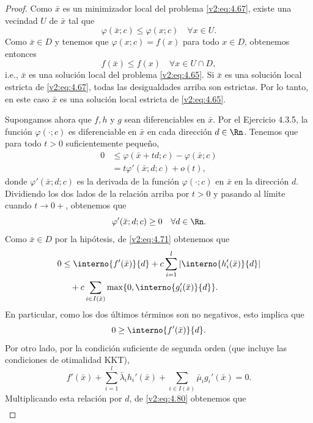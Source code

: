 \begin{proof}
    Como $\bar{x}$ es un minimizador local del problema \eqref{v2:eq:4.67}, existe una vecindad $U$ de $\bar{x}$ tal que
    \[
        \varphi(\bar{x}; c) \le \varphi(x; c) \quad \forall x \in U.
    \]
    Como $\bar{x} \in D$ y tenemos que $\varphi(x; c) = f(x)$ para todo $x \in D$, obtenemos entonces
    \[
        f(\bar{x}) \le f(x) \quad \forall x \in U \cap D,
    \]
    i.e., $\bar{x}$ es una solución local del problema \eqref{v2:eq:4.65}. Si $\bar{x}$ es una solución local estricta de \eqref{v2:eq:4.67}, todas las desigualdades arriba son estrictas. Por lo tanto, en este caso $\bar{x}$ es una solución local estricta de \eqref{v2:eq:4.65}.
    
    Supongamos ahora que $f, h$ y $g$ sean diferenciables en $\bar{x}$. Por el Ejercicio 4.3.5, la función $\varphi(\cdot; c)$ es diferenciable en $\bar{x}$ en cada dirección $d \in \Rn$. Tenemos que para todo $t > 0$ suficientemente pequeño,
    \begin{align*}
        0 &\le \varphi(\bar{x} + td; c) - \varphi(\bar{x}; c) \\
        &= t\varphi'(\bar{x}; d; c) + o(t),
    \end{align*}
    donde $\varphi'(\bar{x}; d; c)$ es la derivada de la función $\varphi(\cdot; c)$ en $\bar{x}$ en la dirección $d$. Dividiendo los dos lados de la relación arriba por $t > 0$ y pasando al límite cuando $t \to 0+$, obtenemos que
    \[
        \varphi'(\bar{x}; d; c) \ge 0 \quad \forall d \in \Rn.
    \]
    Como $\bar{x} \in D$ por la hipótesis, de \eqref{v2:eq:4.71} obtenemos que
    \begin{align}
        0 &\le \interno{f'(\bar{x})}{d} + c\sum_{i=1}^l |\interno{h_i'(\bar{x})}{d}| \nonumber \\
        &\quad + c\sum_{i \in I(\bar{x})} \max\{0, \interno{g_i'(\bar{x})}{d}\}. \label{v2:eq:4.72}
    \end{align}
    En particular, como los dos últimos términos son no negativos, esto implica que
    \begin{equation}
        0 \ge \interno{f'(\bar{x})}{d}. \label{v2:eq:4.81}
    \end{equation}
    Por otro lado, por la condición suficiente de segunda orden (que incluye las condiciones de otimalidad KKT),
    \[
        f'(\bar{x}) + \sum_{i=1}^l \bar{\lambda}_i h_i'(\bar{x}) + \sum_{i \in I(\bar{x})} \bar{\mu}_i g_i'(\bar{x}) = 0.
    \]
    Multiplicando esta relación por $d$, de \eqref{v2:eq:4.80} obtenemos que
    \begin{align*}

\end{align*}
\end{proof}
